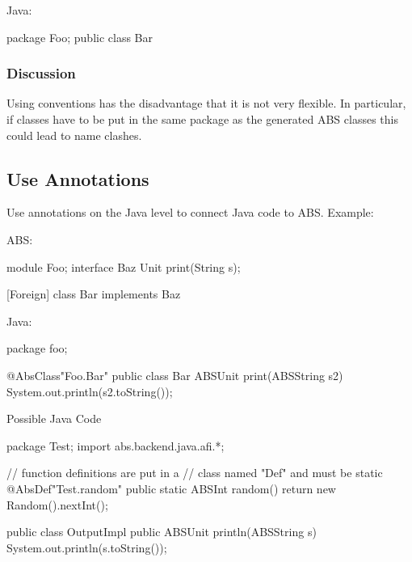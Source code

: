 \documentclass[a4paper,11pt,final]{article}
\begin{document}
\noindent Java:
\begin{javaexample}
package Foo;
public class Bar {

}
\end{javaexample}

\subsubsection{Discussion}
Using conventions has the disadvantage that it is not very flexible. In
particular, if classes have to be put in the same package as the generated ABS
classes this could lead to name clashes.

      
\subsection{Use Annotations}
Use annotations on the Java level to connect Java code to ABS.
Example:
     
\noindent ABS:
\begin{absexamplen}
module Foo;
interface Baz {
  Unit print(String s);
}

[Foreign]
class Bar implements Baz { }
\end{absexamplen}     


\noindent Java:
\begin{javaexample}
package foo;

@AbsClass{"Foo.Bar"}
public class Bar {
  ABSUnit print(ABSString s2) {
    System.out.println(s2.toString());
  }
}
\end{javaexample}

\noindent Possible Java Code
\begin{javaexample}
package Test;
import abs.backend.java.afi.*;

// function definitions are put in a
// class named "Def" and must be static
@AbsDef{"Test.random"}
public static ABSInt random() {
  return new Random().nextInt();
}

public class OutputImpl {
  public ABSUnit println(ABSString s) {
    System.out.println(s.toString());
  }
}
\end{javaexample}
\end{document}
